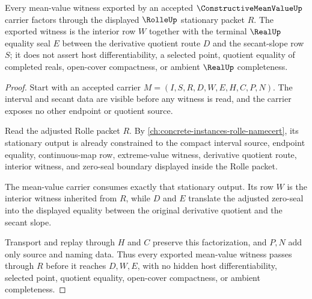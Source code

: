 \begin{theorem}
\label{thm:constructive-mean-value-rolle-factorization}
Every mean-value witness exported by an accepted $\ConstructiveMeanValueUp$ carrier factors through the displayed $\RolleUp$ stationary packet $R$. The exported witness is the interior row $W$ together with the terminal $\RealUp$ equality seal $E$ between the derivative quotient route $D$ and the secant-slope row $S$; it does not assert host differentiability, a selected point, quotient equality of completed reals, open-cover compactness, or ambient $\RealUp$ completeness.
\end{theorem}
\begin{proof}
Start with an accepted carrier $M=(I,S,R,D,W,E,H,C,P,N)$. The interval and secant data are visible before any witness is read, and the carrier exposes no other endpoint or quotient source.

Read the adjusted Rolle packet $R$. By \autoref{ch:concrete-instances-rolle-namecert}, its stationary output is already constrained to the compact interval source, endpoint equality, continuous-map row, extreme-value witness, derivative quotient route, interior witness, and zero-seal boundary displayed inside the Rolle packet.

The mean-value carrier consumes exactly that stationary output. Its row $W$ is the interior witness inherited from $R$, while $D$ and $E$ translate the adjusted zero-seal into the displayed equality between the original derivative quotient and the secant slope.

Transport and replay through $H$ and $C$ preserve this factorization, and $P,N$ add only source and naming data. Thus every exported mean-value witness passes through $R$ before it reaches $D,W,E$, with no hidden host differentiability, selected point, quotient equality, open-cover compactness, or ambient completeness.
\end{proof}



